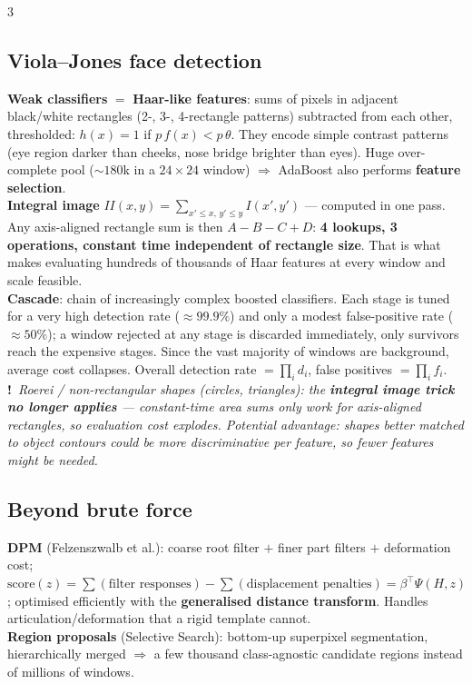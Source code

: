 \documentclass[9pt,a4paper,landscape]{extarticle}
\newcommand{\key}[1]{\textbf{#1}}
\newcommand{\tr}[1]{{\color{trap}\textbf{!}}\ \textit{#1}}
\begin{document}
\begin{multicols}{3}
\subsection{Viola--Jones face detection}
\key{Weak classifiers} $=$ \key{Haar-like features}: sums of pixels in adjacent black/white rectangles (2-, 3-, 4-rectangle patterns) subtracted from each other, thresholded: $h(x)=1$ if $p\,f(x)<p\,\theta$. They encode simple contrast patterns (eye region darker than cheeks, nose bridge brighter than eyes). Huge over-complete pool ($\sim180$k in a $24\times24$ window) $\Rightarrow$ AdaBoost also performs \key{feature selection}.\\
\key{Integral image} $II(x,y)=\sum_{x'\le x,\,y'\le y}I(x',y')$ --- computed in one pass. Any axis-aligned rectangle sum is then $A-B-C+D$: \key{4 lookups, 3 operations, constant time independent of rectangle size}. That is what makes evaluating hundreds of thousands of Haar features at every window and scale feasible.\\
\key{Cascade}: chain of increasingly complex boosted classifiers. Each stage is tuned for a very high detection rate ($\approx99.9\%$) and only a modest false-positive rate ($\approx50\%$); a window rejected at any stage is discarded immediately, only survivors reach the expensive stages. Since the vast majority of windows are background, average cost collapses. Overall detection rate $=\prod_i d_i$, false positives $=\prod_i f_i$.\\
\tr{Roerei / non-rectangular shapes (circles, triangles): the \key{integral image trick no longer applies} --- constant-time area sums only work for axis-aligned rectangles, so evaluation cost explodes. Potential advantage: shapes better matched to object contours could be more discriminative per feature, so fewer features might be needed.}

\subsection{Beyond brute force}
\key{DPM} (Felzenszwalb et al.): coarse root filter $+$ finer part filters $+$ deformation cost; $\text{score}(z)=\sum(\text{filter responses})-\sum(\text{displacement penalties})=\beta^\top\Psi(H,z)$; optimised efficiently with the \key{generalised distance transform}. Handles articulation/deformation that a rigid template cannot.\\
\key{Region proposals} (Selective Search): bottom-up superpixel segmentation, hierarchically merged $\Rightarrow$ a few thousand class-agnostic candidate regions instead of millions of windows.


\end{multicols}
\end{document}
